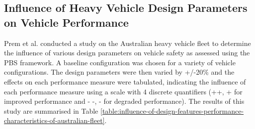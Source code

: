 \subsection{Influence of Heavy Vehicle Design Parameters on Vehicle Performance}\label{section:australian-study-on-the-influence-of-heavy-vehicle-design-parameters}

Prem et al. \cite{Prem2002} conducted a study on the Australian heavy vehicle fleet to determine the influence of various design parameters on vehicle safety as assessed using the PBS framework. A baseline configuration was chosen for a variety of vehicle configurations. The design parameters were then varied by +/-20\% and the effects on each performance measure were tabulated, indicating the influence of each performance measure using a scale with 4 discrete quantifiers (++, + for improved performance and - -, - for degraded performance). The results of this study are summarised in Table \ref{table:influence-of-design-features-performance-characteristics-of-australian-fleet}.

